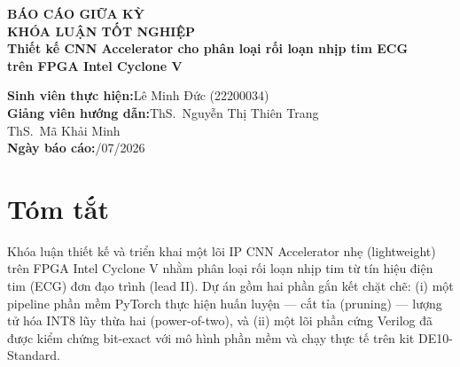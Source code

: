 \documentclass[12pt,a4paper]{article}
\begin{document}
\begin{center}
  \vspace*{1.5cm}
  {\LARGE\bfseries\color{accent} BÁO CÁO GIỮA KỲ}\\[4pt]
  {\LARGE\bfseries\color{accent} KHÓA LUẬN TỐT NGHIỆP}\\[18pt]
  {\large\bfseries Thiết kế CNN Accelerator cho phân loại rối loạn nhịp tim ECG\\
   trên FPGA Intel Cyclone V}\\[2cm]
\end{center}

\begin{flushleft}
  \hspace{2cm}\textbf{Sinh viên thực hiện:}\quad Lê Minh Đức (22200034)\\[6pt]
  \hspace{2cm}\textbf{Giảng viên hướng dẫn:}\quad ThS.\ Nguyễn Thị Thiên Trang\\[2pt]
  \hspace{2cm}\quad ThS.\ Mã Khải Minh\\[6pt]
  \hspace{2cm}\textbf{Ngày báo cáo:}/07/2026\\
\end{flushleft}

\vfill

\clearpage

\section{Tóm tắt}

Khóa luận thiết kế và triển khai một lõi IP CNN Accelerator nhẹ (lightweight) trên FPGA
Intel Cyclone V nhằm phân loại rối loạn nhịp tim từ tín hiệu điện tim (ECG) đơn đạo trình
(lead II). Dự án gồm hai phần gắn kết chặt chẽ: (i) một pipeline phần mềm PyTorch thực hiện
huấn luyện --- cắt tỉa (pruning) --- lượng tử hóa INT8 lũy thừa hai (power-of-two), và (ii)
một lõi phần cứng Verilog đã được kiểm chứng bit-exact với mô hình phần mềm và chạy thực tế
trên kit DE10-Standard.
\end{document}
